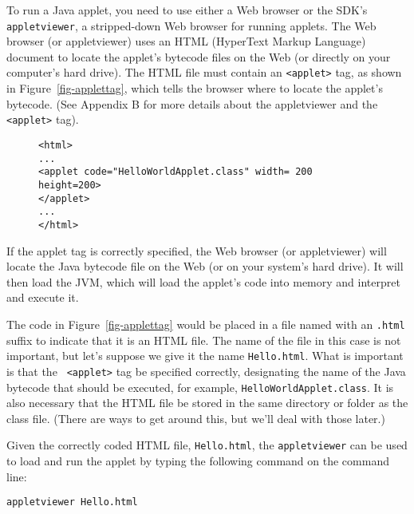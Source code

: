 To run a Java applet, you need to use either a Web browser or the
SDK's {\tt appletviewer}, a stripped-down Web browser for running
applets. The Web browser (or appletviewer) uses an HTML (HyperText
Markup Language) document to locate the applet's bytecode files on the
Web (or directly on your computer's hard drive). The HTML file must
contain an {\tt <applet>} tag, as shown in Figure~\ref{fig-applettag},
which tells the browser where to locate the applet's bytecode.  (See
Appendix B for more details about the appletviewer and the {\tt
<applet>} tag).

\begin{figure}[hb]
\jjjprogstart
\begin{jjjlisting}[27pc]
\begin{lstlisting}
<html>
...
<applet code="HelloWorldApplet.class" width= 200 height=200>
</applet>
...
</html>
\end{lstlisting}
\end{jjjlisting}
\end{figure}

If the applet tag is correctly specified, the Web browser (or
appletviewer) will locate the Java bytecode file on the Web (or
on your system's hard drive). It will then load the
JVM, which will load the applet's code into memory and interpret
and execute it.

The code in Figure~\ref{fig-applettag} would be placed in a file named
with an {\tt .html} suffix to indicate that it is an HTML file.  The
name of the file in this case is not important, but let's suppose we
give it the name {\tt Hello.html}.  What is important is that the {\tt
<applet>} tag be specified correctly, designating
the name of the Java bytecode that should be executed, for example,
{\tt HelloWorldApplet.class}. It is also necessary that the HTML file
be stored in the same directory or folder as the class file.  (There
are ways to get around this, but we'll deal with those later.)

Given the correctly coded HTML file, {\tt Hello.html},
the {\tt appletviewer} can be used to load and run the applet
by typing the following command on the command line:


\begin{jjjlisting}
\begin{lstlisting}
appletviewer Hello.html
\end{lstlisting}
\end{jjjlisting}


